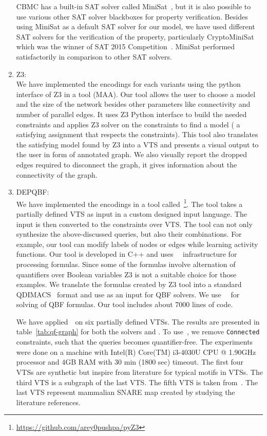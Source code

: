 \begin{enumerate}
CBMC has a built-in SAT solver called MiniSat~\cite{sorensson2005minisat}, but it is also possible to use various other SAT solver blackboxes for property verification. Besides using MiniSat as a default SAT solver for our model,
		we have used different SAT solvers for the verification of the property, particularly CryptoMiniSat~\cite{soos2016cryptominisat} which was the winner of SAT 2015 Competition~\cite{balyo2016sat}. 
%		
MiniSat performed satisfactorily in comparison to other SAT solvers.
\item Z3: \\
	We have implemented the encodings for each variants using the python interface of Z3 in a tool (MAA). 
%
Our tool allows the user to choose a model and the size
of the network besides other parameters like connectivity and number of parallel edges. 
%		
It uses Z3 Python interface to build the needed constraints and applies Z3 solver on the constraints to find a model ( a satisfying assignment that respects the constraints). 
%
This tool also translates the satisfying model found by Z3 into
a VTS and presents a visual output to the user in form of annotated graph. 
%
We also visually report the dropped edges required to disconnect the graph, it gives information about the connectivity of the graph.


\item DEPQBF: \\
We have implemented the encodings in a tool
called~\ourtool\footnote{{\url{https://github.com/arey0pushpa/pyZ3}}}.
%
The tool takes a partially defined VTS as input in a custom designed
input language.
%
The input is then converted to the constraints over VTS. 
%
The tool can not only synthesize the above-discussed queries, but also their
combinations.
%
For example, our tool can modify labels of nodes or edges while
learning activity functions.
%
Our tool is developed in C++ and uses~\zthree~\cite{z3} infrastructure for
processing formulas. 
%
Since some of the formulas involve alternation of quantifiers over
Boolean variables Z3 is not a suitable choice for those examples.
%
We translate the formulas created by Z3 tool into a standard
QDIMACS~\cite{qdimacs} format and use as an input for QBF solvers. 
%
We use~\depqbf~\cite{lonsing2010depqbf} for solving of QBF formulas. 
%
Our tool includes about 7000 lines of code.

We have applied~\ourtool~on six partially defined VTSs.
%
The results are presented in table~\ref{tab:qf-graph} for both the solvers
\depqbf and \zthree.
%
To use~\zthree, we remove \texttt{Connected} constraints, such that the queries becomes
quantifier-free.
%
%
The experiments were done on a machine with Intel(R) Core(TM) i3-4030U
CPU @ 1.90GHz processor and 4GB RAM with 30 min (1800 sec) timeout.
%
The first four VTSs are synthetic but inspire from literature for
typical motifs in VTSs. 
The third VTS is a subgraph of the last VTS.
%
%
The fifth VTS is taken from~\cite{burri2004complete}.
%
The last VTS represent mammalian SNARE map created by studying the literature references.  


\end{enumerate}

